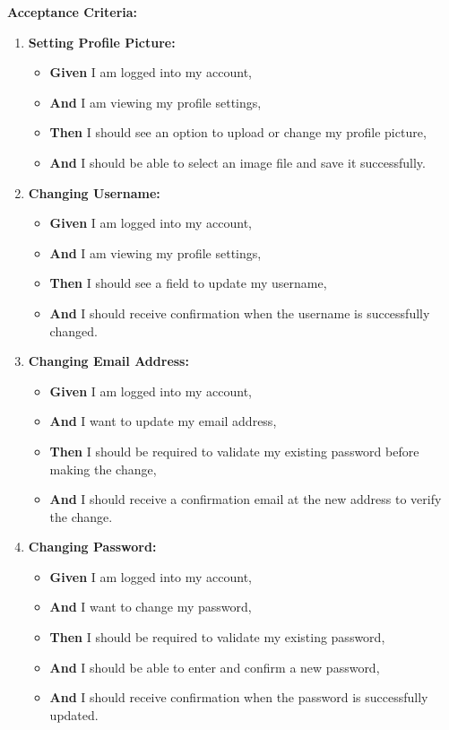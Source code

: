 \documentclass[12pt]{article}
\begin{document}
\vspace{1em}
\textbf{Acceptance Criteria:}
\begin{enumerate}
    \item \textbf{Setting Profile Picture:}
    \begin{itemize}
        \item \textbf{Given} I am logged into my account,
        \item \textbf{And} I am viewing my profile settings,
        \item \textbf{Then} I should see an option to upload or change my profile picture,
        \item \textbf{And} I should be able to select an image file and save it successfully.
    \end{itemize}

    \item \textbf{Changing Username:}
    \begin{itemize}
        \item \textbf{Given} I am logged into my account,
        \item \textbf{And} I am viewing my profile settings,
        \item \textbf{Then} I should see a field to update my username,
        \item \textbf{And} I should receive confirmation when the username is successfully changed.
    \end{itemize}

    \item \textbf{Changing Email Address:}
    \begin{itemize}
        \item \textbf{Given} I am logged into my account,
        \item \textbf{And} I want to update my email address,
        \item \textbf{Then} I should be required to validate my existing password before making the change,
        \item \textbf{And} I should receive a confirmation email at the new address to verify the change.
    \end{itemize}

    \item \textbf{Changing Password:}
    \begin{itemize}
        \item \textbf{Given} I am logged into my account,
        \item \textbf{And} I want to change my password,
        \item \textbf{Then} I should be required to validate my existing password,
        \item \textbf{And} I should be able to enter and confirm a new password,
        \item \textbf{And} I should receive confirmation when the password is successfully updated.
    \end{itemize}


\end{enumerate}
\end{document}
